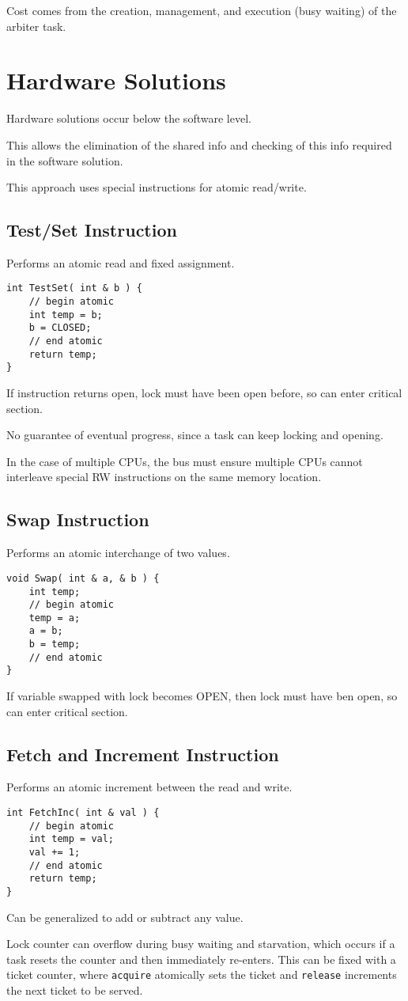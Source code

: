 \documentclass[11pt]{article}
\begin{document}
Cost comes from the creation, management, and execution (busy waiting) of the arbiter
task.
\section{Hardware Solutions}
\label{sec:org1d8eb2d}
Hardware solutions occur below the software level.

This allows the elimination of the shared info and checking of this info required
in the software solution.

This approach uses special instructions for atomic read/write.
\subsection{Test/Set Instruction}
\label{sec:orgc3e6f6d}
Performs an atomic read and fixed assignment.
\begin{verbatim}
int TestSet( int & b ) {
    // begin atomic
    int temp = b;
    b = CLOSED;
    // end atomic
    return temp;
}
\end{verbatim}

If instruction returns open, lock must have been open before, so can enter critical
section.

No guarantee of eventual progress, since a task can keep locking and opening.

In the case of multiple CPUs, the bus must ensure multiple CPUs cannot interleave
special RW instructions on the same memory location.
\subsection{Swap Instruction}
\label{sec:orgea9ba38}
Performs an atomic interchange of two values.
\begin{verbatim}
void Swap( int & a, & b ) {
    int temp;
    // begin atomic
    temp = a;
    a = b;
    b = temp;
    // end atomic
}
\end{verbatim}

If variable swapped with lock becomes OPEN, then lock must have ben open, so can
enter critical section.
\subsection{Fetch and Increment Instruction}
\label{sec:org68cad89}
Performs an atomic increment between the read and write.
\begin{verbatim}
int FetchInc( int & val ) {
    // begin atomic
    int temp = val;
    val += 1;
    // end atomic
    return temp;
}
\end{verbatim}

Can be generalized to add or subtract any value.

Lock counter can overflow during busy waiting and starvation, which occurs
if a task resets the counter and then immediately re-enters.
This can be fixed with a ticket counter, where \texttt{acquire} atomically sets the
ticket and \texttt{release} increments the next ticket to be served.
\end{document}
